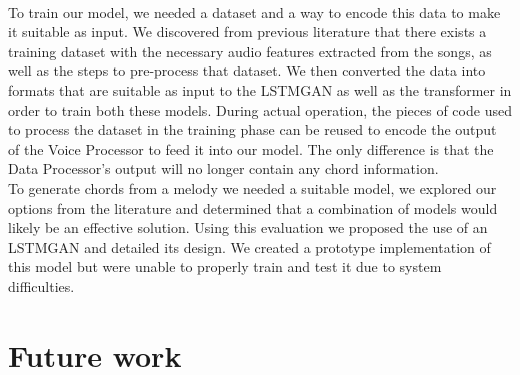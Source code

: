 \\
To train our model, we needed a dataset and a way to encode this data to make it suitable as input. 
We discovered from previous literature that there exists a training dataset with the necessary audio features extracted from the songs, as well as the steps to pre-process that dataset. 
We then converted the data into formats that are suitable as input to the LSTMGAN as well as the transformer in order to train both these models. 
During actual operation, the pieces of code used to process the dataset in the training phase can be reused to encode the output of the Voice Processor to feed it into our model. 
The only difference is that the Data Processor's output will no longer contain any chord information.
\\
To generate chords from a melody we needed a suitable model, we explored our options from the literature and determined that a combination of models would likely be an effective solution.
Using this evaluation we proposed the use of an LSTMGAN and detailed its design.
We created a prototype implementation of this model but were unable to properly train and test it due to system difficulties.

\section{Future work}


